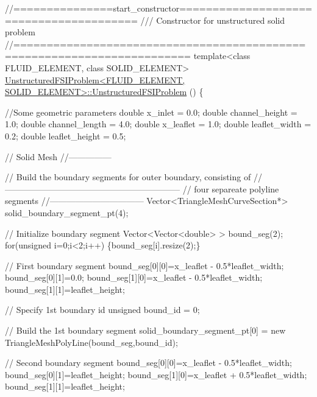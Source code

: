  
\begin{DoxyCodeInclude}
\textcolor{comment}{//===============start\_constructor========================================}
\textcolor{comment}{/// Constructor for unstructured solid problem}
\textcolor{comment}{}\textcolor{comment}{//========================================================================}
\textcolor{keyword}{template}<\textcolor{keyword}{class} FLUID\_ELEMENT, \textcolor{keyword}{class} SOLID\_ELEMENT>
\hyperlink{classUnstructuredFSIProblem_a6a31fd839e0215ef1312942cf7284bd2}{UnstructuredFSIProblem<FLUID\_ELEMENT, SOLID\_ELEMENT>::UnstructuredFSIProblem}
      () 
\{  

 \textcolor{comment}{//Some geometric parameters}
 \textcolor{keywordtype}{double} x\_inlet = 0.0;
 \textcolor{keywordtype}{double} channel\_height = 1.0;
 \textcolor{keywordtype}{double} channel\_length = 4.0;
 \textcolor{keywordtype}{double} x\_leaflet = 1.0;
 \textcolor{keywordtype}{double} leaflet\_width = 0.2;
 \textcolor{keywordtype}{double} leaflet\_height = 0.5;

 \textcolor{comment}{// Solid Mesh}
 \textcolor{comment}{//---------------}

 \textcolor{comment}{// Build the boundary segments for outer boundary, consisting of}
 \textcolor{comment}{//--------------------------------------------------------------}
 \textcolor{comment}{// four separeate polyline segments}
 \textcolor{comment}{//---------------------------------}
 Vector<TriangleMeshCurveSection*> solid\_boundary\_segment\_pt(4);
 
 \textcolor{comment}{// Initialize boundary segment}
 Vector<Vector<double> > bound\_seg(2);
 \textcolor{keywordflow}{for}(\textcolor{keywordtype}{unsigned} i=0;i<2;i++) \{bound\_seg[i].resize(2);\}
 
 \textcolor{comment}{// First boundary segment}
 bound\_seg[0][0]=x\_leaflet - 0.5*leaflet\_width;
 bound\_seg[0][1]=0.0;
 bound\_seg[1][0]=x\_leaflet - 0.5*leaflet\_width;
 bound\_seg[1][1]=leaflet\_height;
 
 \textcolor{comment}{// Specify 1st boundary id}
 \textcolor{keywordtype}{unsigned} bound\_id = 0;

 \textcolor{comment}{// Build the 1st boundary segment}
 solid\_boundary\_segment\_pt[0] = \textcolor{keyword}{new} TriangleMeshPolyLine(bound\_seg,bound\_id);
 
 \textcolor{comment}{// Second boundary segment}
 bound\_seg[0][0]=x\_leaflet - 0.5*leaflet\_width;
 bound\_seg[0][1]=leaflet\_height;
 bound\_seg[1][0]=x\_leaflet + 0.5*leaflet\_width;
 bound\_seg[1][1]=leaflet\_height;


\end{DoxyCodeInclude}
